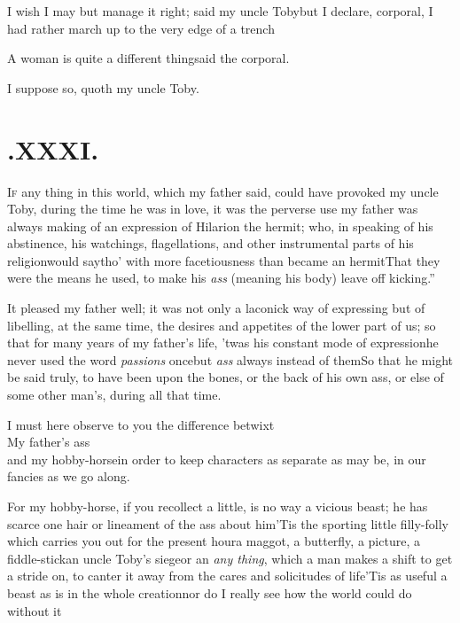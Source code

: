 \documentclass{article}
\begin{document}
I wish I may but manage it right; said my uncle
Toby\tsk but I declare, corporal, I had rather march up to
the very edge of a trench\tsh{}

\tsk A woman is quite a different thing\break\tsk said the
corporal.

\tsk I suppose so, quoth my uncle Toby.

\section{.\enspace XXXI.}

\lettrine{I}{f} any thing in this world, which my\break
father said, could have provoked my uncle Toby, during the
time he was in love, it was the perverse use my father was always
making of an expression of Hilarion the hermit; who, in
speaking of his abstinence, his watchings, flagellations, and other
instrumental parts of his religion\tsk would say\tsk tho’
with more facetiousness than became an
hermit\tsk \lqq That they were the means he used, to make
his \textit{ass} (meaning his body) leave off
kicking.”

It pleased my father well; it was not only a laconick way of
expressing\tsh\break
but of libelling, at the same time, the desires and appetites of
the lower part of us; so that for many years of my father’s
life, ’twas his constant mode of expression\tsk he never used
the word \textit{passions} once\tsk but \textit{ass} always
instead of them\tsh So that he might be said truly, to have been
upon the bones, or the back of his own ass, or else of some
other man’s, during all that time.

I must here observe to you the difference betwixt\\
\null\qquad My father’s ass\\
\null\qquad and my hobby-horse\tsk in order to keep
characters as separate as may be, in our fancies as we go
along.

For my hobby-horse, if you recollect a little, is no way a
vicious beast; he has scarce one hair or lineament of the ass about
him\tsh ’Tis the sporting little filly-folly which
carries you out for the present hour\tsk a maggot, a butterfly, a
picture, a fiddle-stick\tsk an uncle Toby’s
siege\tsk or an \textit{any thing}, which a man makes a shift to
get a stride on, to canter it away from the cares and solicitudes
of life\tsk ’Tis as useful a beast as is in the whole
creation\tsk nor do I really see how the world could do without
it\tsh
\end{document}
